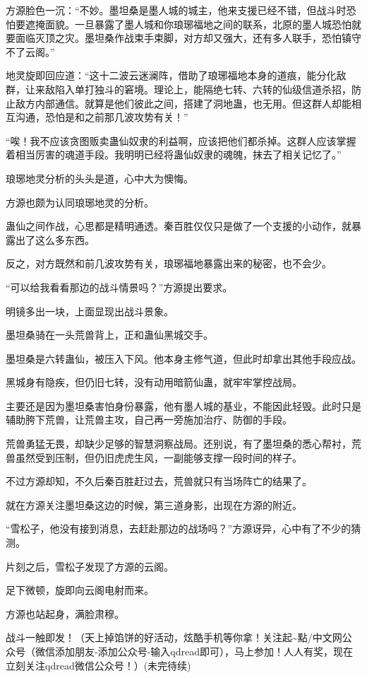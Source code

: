 \begin{this_body}
方源脸色一沉：“不妙。墨坦桑是墨人城的城主，他来支援已经不错，但战斗时恐怕要遮掩面貌。一旦暴露了墨人城和你琅琊福地之间的联系，北原的墨人城恐怕就要面临灭顶之灾。墨坦桑作战束手束脚，对方却又强大，还有多人联手，恐怕镇守不了云阁。”

地灵旋即回应道：“这十二波云迷澜阵，借助了琅琊福地本身的道痕，能分化敌群，让来敌陷入单打独斗的窘境。理论上，能隔绝七转、六转的仙级信道杀招，防止敌方内部通信。就算是他们彼此之间，搭建了洞地蛊，也无用。但这群人却能相互沟通，恐怕是和之前那几波攻势有关！”

“唉！我不应该贪图贩卖蛊仙奴隶的利益啊，应该把他们都杀掉。这群人应该掌握着相当厉害的魂道手段。我明明已经将蛊仙奴隶的魂魄，抹去了相关记忆了。”

琅琊地灵分析的头头是道，心中大为懊悔。

方源也颇为认同琅琊地灵的分析。

蛊仙之间作战，心思都是精明通透。秦百胜仅仅只是做了一个支援的小动作，就暴露出了这么多东西。

反之，对方既然和前几波攻势有关，琅琊福地暴露出来的秘密，也不会少。

“可以给我看看那边的战斗情景吗？”方源提出要求。

明镜多出一块，上面显现出战斗景象。

墨坦桑骑在一头荒兽背上，正和蛊仙黑城交手。

墨坦桑是六转蛊仙，被压入下风。他本身主修气道，但此时却拿出其他手段应战。

黑城身有隐疾，但仍旧七转，没有动用暗箭仙蛊，就牢牢掌控战局。

主要还是因为墨坦桑害怕身份暴露，他有墨人城的基业，不能因此轻毁。此时只是辅助胯下荒兽，让荒兽主攻，自己再一旁施加治疗、防御的手段。

荒兽勇猛无畏，却缺少足够的智慧洞察战局。还别说，有了墨坦桑的悉心帮衬，荒兽虽然受到压制，但仍旧虎虎生风，一副能够支撑一段时间的样子。

不过方源却知，不久后秦百胜赶过去，荒兽就只有当场阵亡的结果了。

就在方源关注墨坦桑这边的时候，第三道身影，出现在方源的附近。

“雪松子，他没有接到消息，去赶赴那边的战场吗？”方源讶异，心中有了不少的猜测。

片刻之后，雪松子发现了方源的云阁。

足下微顿，旋即向云阁电射而来。

方源也站起身，满脸肃穆。

战斗一触即发！（天上掉馅饼的好活动，炫酷手机等你拿！关注起\~{}點/中文网公众号（微信添加朋友-添加公众号-输入qdread即可），马上参加！人人有奖，现在立刻关注qdread微信公众号！）(未完待续)

\end{this_body}

